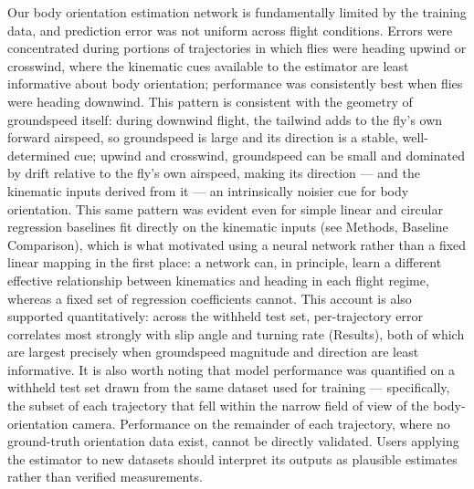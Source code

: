 \documentclass[11pt]{article}
\begin{document}
Our body orientation estimation network is fundamentally limited by the training data, and prediction error was not uniform across flight conditions. Errors were concentrated during portions of trajectories in which flies were heading upwind or crosswind, where the kinematic cues available to the estimator are least informative about body orientation; performance was consistently best when flies were heading downwind. This pattern is consistent with the geometry of groundspeed itself: during downwind flight, the tailwind adds to the fly's own forward airspeed, so groundspeed is large and its direction is a stable, well-determined cue; upwind and crosswind, groundspeed can be small and dominated by drift relative to the fly's own airspeed, making its direction --- and the kinematic inputs derived from it --- an intrinsically noisier cue for body orientation. This same pattern was evident even for simple linear and circular regression baselines fit directly on the kinematic inputs (see Methods, Baseline Comparison), which is what motivated using a neural network rather than a fixed linear mapping in the first place: a network can, in principle, learn a different effective relationship between kinematics and heading in each flight regime, whereas a fixed set of regression coefficients cannot. This account is also supported quantitatively: across the withheld test set, per-trajectory error correlates most strongly with slip angle and turning rate (Results), both of which are largest precisely when groundspeed magnitude and direction are least informative.
It is also worth noting that model performance was quantified on a withheld test set drawn from the same dataset used for training \citep{van2014plume} --- specifically, the subset of each trajectory that fell
within the narrow field of view of the body-orientation camera.
Performance on the remainder of each trajectory, where no ground-truth orientation data exist,
cannot be directly validated. Users applying the estimator to new datasets should interpret its outputs as plausible estimates rather than verified measurements.
 
\end{document}

